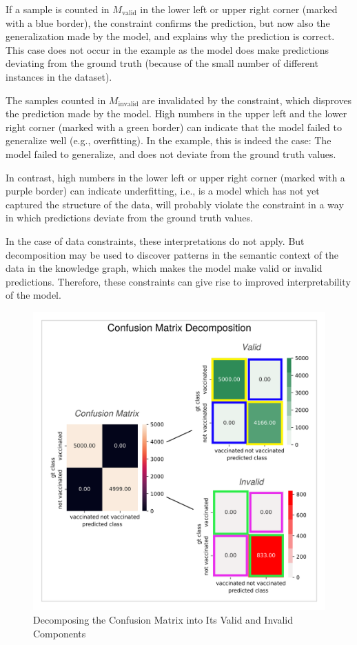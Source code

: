 If a sample is counted in $M_\text{valid}$ in the lower left or upper right corner (marked with a blue border), the constraint confirms the prediction, but now also the generalization made by the model, and explains why the prediction is correct. This case does not occur in the example as the model does make predictions deviating from the ground truth (because of the small number of different instances in the dataset). 

The samples counted in $M_\text{invalid}$ are invalidated by the constraint, which disproves the prediction made by the model. High numbers in the upper left and the lower right corner (marked with a green border) can indicate that the model failed to generalize well (e.g., overfitting). In the example, this is indeed the case: The model failed to generalize, and does not deviate from the ground truth values.

In contrast, high numbers in the lower left or upper right corner (marked with a purple border) can indicate underfitting, i.e., is a model which has not yet captured the structure of the data, will probably violate the constraint in a way in which predictions deviate from the ground truth values.

In the case of data constraints, these interpretations do not apply. But decomposition may be used to discover patterns in the semantic context of the data in the knowledge graph, which makes the model make valid or invalid predictions. Therefore, these constraints can give rise to improved interpretability of the model.

\begin{figure}[htb]
    \centering
    \includegraphics[scale=.08]{images/visualizations/confusion_matrix_decomposition_valid_invalid_marked.png}     
    \caption{Decomposing the Confusion Matrix into Its Valid and Invalid Components}
    \label{fig:confusion_matrix_decomposition_valid_invalid}
\end{figure}

